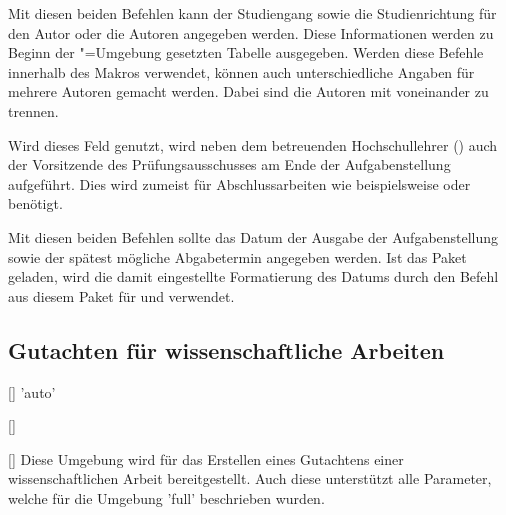 \begin{Declaration*}{}
\begin{Declaration}{}
\begin{Declaration}[v2.02]{}
\printdeclarationlist%
%
%
Mit diesen beiden Befehlen kann der Studiengang sowie die Studienrichtung für 
den Autor oder die Autoren angegeben werden. Diese Informationen werden zu 
Beginn der "=Umgebung gesetzten Tabelle ausgegeben. Werden 
diese Befehle innerhalb des Makros  verwendet, können auch 
unterschiedliche Angaben für mehrere Autoren gemacht werden. Dabei sind die 
Autoren mit  voneinander zu trennen.
\end{Declaration}
\end{Declaration}

\begin{Declaration}{}
\printdeclarationlist%
%
Wird dieses Feld genutzt, wird neben dem betreuenden Hochschullehrer 
() auch der Vorsitzende des Prüfungsausschusses am Ende der 
Aufgabenstellung aufgeführt. Dies wird zumeist für Abschlussarbeiten wie 
beispielsweise \masterthesisname{} oder \diplomathesisname{} benötigt.
\end{Declaration}

\begin{Declaration}{}
\begin{Declaration}{}
\printdeclarationlist%
%
Mit diesen beiden Befehlen sollte das Datum der Ausgabe der Aufgabenstellung 
sowie der spätest mögliche Abgabetermin angegeben werden. Ist das Paket 
 geladen, wird die damit eingestellte Formatierung des Datums 
durch den Befehl  aus diesem Paket für  und 
 verwendet.
\end{Declaration}
\end{Declaration}


\subsection{Gutachten für wissenschaftliche Arbeiten}
\begin{Declaration}{[]}{%
  'auto'%
}
\begin{Declaration}{%
  []%
}
\begin{Declaration}{[]}
\printdeclarationlist%
%
%
Diese Umgebung wird für das Erstellen eines Gutachtens einer wissenschaftlichen 
Arbeit bereitgestellt. Auch diese unterstützt alle Parameter, welche für die 
Umgebung 'full' beschrieben wurden.


\end{Declaration}
\end{Declaration}
\end{Declaration}
\end{Declaration*}
